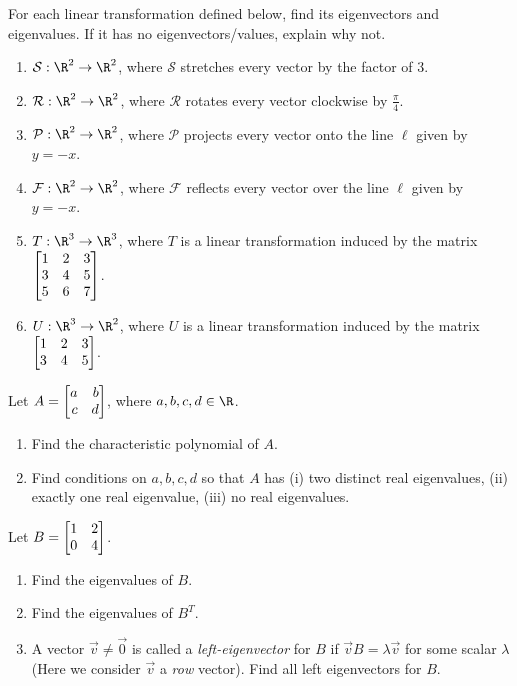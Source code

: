 \begin{exercises}
	\begin{problist}
		\prob For each linear transformation defined below, find its
		eigenvectors and eigenvalues. If it has no eigenvectors/values,
		explain why not.
		\begin{enumerate}
			\item $\mathcal S:\R^{2}\to\R^{2}$, where $\mathcal S$
				stretches every
				vector by the factor of $3$.

			\item $\mathcal R:\R^{2}\to\R^{2}$, where $\mathcal R$  
				rotates every vector
				clockwise by $\frac{\pi}{4}$.

			\item $\mathcal P:\R^{2}\to\R^{2}$, where $\mathcal P$
				projects every vector
				onto the line $\ell$ given by $y=-x$.

			\item $\mathcal F:\R^{2}\to\R^{2}$, where $\mathcal F$
				reflects every
				vector over the line $\ell$ given by $y=-x$.

			\item $T:\R^{3}\to\R^{3}$, where $T$ is a linear
				transformation induced by the matrix
				$\mat{1&2&3\\3&4&5\\5&6&7}$.

			\item $U:\R^{3}\to\R^{2}$, where $U$ is a linear
				transformation induced by the matrix
				$\mat{1&2&3\\3&4&5}$.
		\end{enumerate}

		\prob Let $A = \mat{a&b\\c&d}$, where $a,b,c,d \in \R$.
		\begin{enumerate}
			\item Find the characteristic polynomial of $A$.
		
			\item Find conditions on $a,b,c,d$ so that $A$ has (i) two distinct
				real eigenvalues, (ii) exactly one real eigenvalue, (iii) no
				real eigenvalues.
		\end{enumerate}

		\prob Let $B=\mat{1&2\\0&4}$.
		\begin{enumerate}
			\item Find the eigenvalues of $B$.
			\item Find the eigenvalues of $B^T$.
			\item A vector $\vec v\neq\vec 0$ is called a \emph{left-eigenvector} for $B$ if
				$\vec vB=\lambda \vec v$ for some scalar $\lambda$ (Here we consider $\vec v$ a \emph{row} vector). Find all
				left eigenvectors for $B$.
		\end{enumerate}


\end{problist}
\end{exercises}
